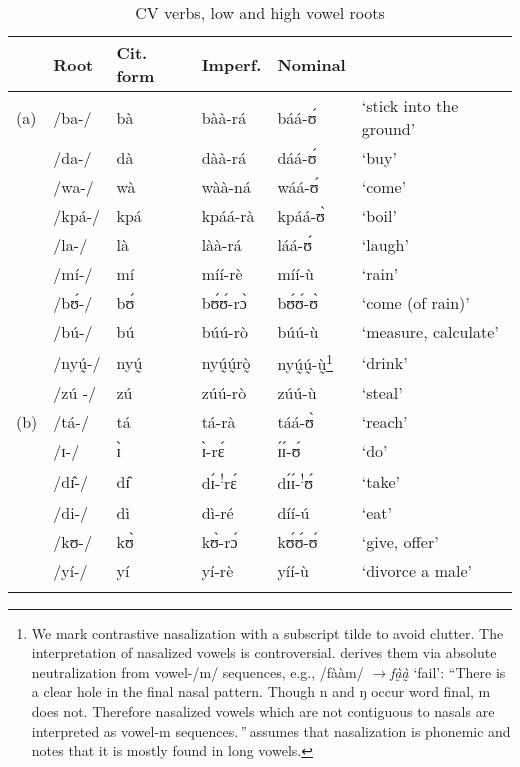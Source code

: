 \documentclass[output=paper,newtxmath,modfonts,nonflat,draftmode]{langsci/langscibook}
\begin{document}
\begin{table}[b]
\begin{tabularx}{\textwidth}{lllllX}
\lsptoprule
& {Root} & {Cit. form} & {Imperf.} & {Nominal} & \\
\midrule
(a) & /ba-/ & bà & bàà-rá & báá-ʊ́ & ‘stick into the ground’\\
& /da-/ & dà & dàà-rá & dáá-ʊ́ & ‘buy’\\
& /wa-/ & wà & wàà-ná & wáá-ʊ́ & ‘come’\\
& /kpá-/ & kpá  & kpáá-rà  & kpáá-ʊ̀  & ‘boil’\\
& /la-/ & là  & làà-rá  & láá-ʊ́  & ‘laugh’\\
& /mí-/ & mí  & míí-rè	& míí-ù  & ‘rain’\\
& /bʊ́-/ & bʊ́ & bʊ́ʊ́-rɔ̀ &	bʊ́ʊ́-ʊ̀ & ‘come (of rain)’\\
& /bú-/ & bú & búú-rò	&	búú-ù	 & ‘measure, calculate’\\
& /nyṵ́-/ & nyṵ́ & nyṵ́ṵ́rò̰ &	nyṵ́ṵ́-ṵ̀\footnote{We mark contrastive nasalization with a subscript tilde to avoid clutter. The interpretation of nasalized vowels is controversial. \citet[12]{Kennedy1966} derives them via absolute neutralization from vowel-/m/ sequences, e.g., /fààm/ $\rightarrow$\textit{fà̰à}̰ ‘fail’: “There is a clear hole in the final nasal pattern. Though n and ŋ occur word final, m does not. Therefore nasalized vowels which are not contiguous to nasals are interpreted as vowel-m sequences.\textit{”} \citet[9]{Bodomo1997} assumes that nasalization is phonemic and notes that it is mostly found in long vowels.}& ‘drink’\\
& /zú{} -/ & z\'u{}  & zúú-rò &	zúú-ù & ‘steal’\\
\tablevspace
(b) & /tá-/ & tá & tá-rà &	táá-ʊ̀ & ‘reach’\\
& /ɪ-/ & ɪ̀ & ɪ̀-rɛ́ &	ɪ́ɪ́-ʊ́ & ‘do’\\
& /dɪ̂-/ & dɪ̂ & dɪ́-\textsuperscript{!}rɛ́ & dɪ́ɪ́-\textsuperscript{!}ʊ́  & ‘take’\\
& /di-/ & dì & dì-ré & díí-ú & ‘eat’\\
& /kʊ-/ & kʊ̀ & kʊ̀-rɔ́ &	kʊ́ʊ́-ʊ́ & ‘give, offer’\\
& /yí-/ & yí{}  & yí-rè &	yíí-ù  & ‘divorce a male’\\
\lspbottomrule
\end{tabularx} 
\caption{CV verbs, low and high vowel roots}
\label{tab:anttila:6}
\end{table}
 
\end{document}
